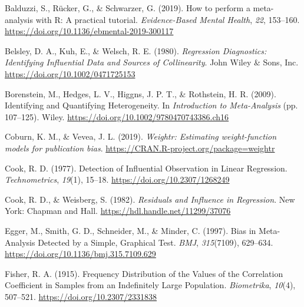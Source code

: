 \documentclass[
  bookmarksnumbered]{article}
\newlength{\cslhangindent}
\newlength{\cslentryspacingunit} %
\newenvironment{CSLReferences}[2] %
 {%
  \setlength{\parindent}{0pt}
  \ifodd #1
  \let\oldpar\par
  \def\par{\hangindent=\cslhangindent\oldpar}
  \fi
  \setlength{\parskip}{#2\cslentryspacingunit}
 }%
 {}
\begin{document}
\hypertarget{refs}{}
\begin{CSLReferences}{1}{0}
\leavevmode{}%
Balduzzi, S., Rücker, G., \& Schwarzer, G. (2019). How to perform a meta-analysis with {R}: A practical tutorial. \emph{Evidence-Based Mental Health}, \emph{22}, 153--160. \url{https://doi.org/10.1136/ebmental-2019-300117}

\leavevmode{}%
Belsley, D. A., Kuh, E., \& Welsch, R. E. (1980). \emph{Regression {Diagnostics}: {Identifying Influential Data} and {Sources} of {Collinearity}}. {John Wiley \& Sons, Inc.} \url{https://doi.org/10.1002/0471725153}

\leavevmode{}%
Borenstein, M., Hedges, L. V., Higgns, J. P. T., \& Rothstein, H. R. (2009). Identifying and {Quantifying Heterogeneity}. In \emph{Introduction to {Meta}-{Analysis}} (pp. 107--125). Wiley. \url{https://doi.org/10.1002/9780470743386.ch16}

\leavevmode{}%
Coburn, K. M., \& Vevea, J. L. (2019). \emph{Weightr: Estimating weight-function models for publication bias}. \url{https://CRAN.R-project.org/package=weightr}

\leavevmode{}%
Cook, R. D. (1977). Detection of {Influential Observation} in {Linear Regression}. \emph{Technometrics}, \emph{19}(1), 15--18. \url{https://doi.org/10.2307/1268249}

\leavevmode{}%
Cook, R. D., \& Weisberg, S. (1982). \emph{Residuals and {Influence} in {Regression}}. {New York: Chapman and Hall}. \url{https://hdl.handle.net/11299/37076}

\leavevmode{}%
Egger, M., Smith, G. D., Schneider, M., \& Minder, C. (1997). {Bias in Meta-Analysis Detected by a Simple, Graphical Test}. \emph{BMJ}, \emph{315}(7109), 629--634. \url{https://doi.org/10.1136/bmj.315.7109.629}

\leavevmode{}%
Fisher, R. A. (1915). Frequency {Distribution} of the {Values} of the {Correlation Coefficient} in {Samples} from an {Indefinitely Large Population}. \emph{Biometrika}, \emph{10}(4), 507--521. \url{https://doi.org/10.2307/2331838}


\end{CSLReferences}
\end{document}
